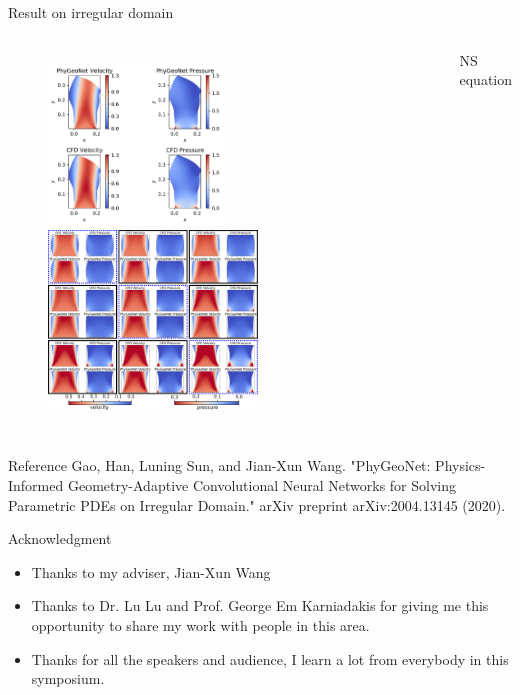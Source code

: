 \documentclass{beamer}
\begin{document}
\begin{frame}{Result on irregular domain}
\begin{columns}[c]
\begin{figure}
	\includegraphics[width=0.5\textwidth]{DetNS_15000VelMagAndPressure.pdf}
	\vfill
	\includegraphics[width=0.6\textwidth]{ParaNS_ResultContour.pdf}
\end{figure}
\centering
NS equation
\end{columns}
\end{frame}


\begin{frame}{Reference}
Gao, Han, Luning Sun, and Jian-Xun Wang. "PhyGeoNet: Physics-Informed Geometry-Adaptive Convolutional Neural Networks for Solving Parametric PDEs on Irregular Domain." arXiv preprint arXiv:2004.13145 (2020).
\end{frame}

\begin{frame}{Acknowledgment}
\begin{itemize}
	\item Thanks to my adviser, Jian-Xun Wang
	\item Thanks to Dr. Lu Lu and Prof. George Em Karniadakis for giving me this opportunity to share my work with people in this area.
	\item Thanks for all the speakers and audience, I learn a lot from everybody in this symposium.
\end{itemize}
\end{frame}

\end{document}

